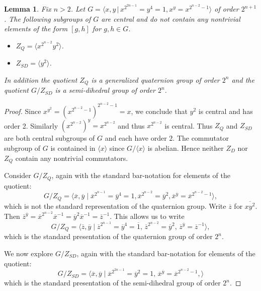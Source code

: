 \documentclass[12pt]{amsart}
\newtheorem{lemma}[theorem]{Lemma}
\begin{document}
\begin{lemma}\label{lem: Q_SD}
Fix $n>2$. Let $G =\langle x,y\,|\, x^{2^{2n-1}}=y^4 = 1, x^y = x^{2^{n-2}-1}\rangle$ of order $2^{n+1}$. 
The following subgroups of $G$ are central and do not contain any nontrivial elements of the form $[g,h]$ for $g,h\in G$. 
\begin{itemize} 
\item $Z_Q = \langle  x^{2^{n-2}} y^2 \rangle$.
\item $Z_{SD} = \langle y^2 \rangle$.
\end{itemize} In addition the quotient $Z_Q$ is a generalized quaternion group of order $2^n$ and the quotient $G/Z_{SD}$ is a semi-dihedral group of order $2^n$. 
\end{lemma}
\begin{proof}
    Since $x^{y^2} = (x^{2^{n-2}-1})^{2^{n-2}-1} = x$, we conclude that $y^2$ is central and has order 2. Similarly $({x^{2^{n-2}}})^y = x^{2^{n-2}}$ and thus $x^{2^{n-2}}$ is central. Thus $Z_Q$ and $Z_{SD}$ are both central subgroups of $G$ and each have order $2$. The commutator subgroup of $G$ is contained in $\langle x \rangle$ since $G/\langle x \rangle$ is abelian. Hence neither $Z_D$ nor $Z_Q$ contain any nontrivial commutators. 

Consider $G/Z_Q$, again with the standard bar-notation for elements of the quotient: 
\[G/Z_Q = \langle \overline{x},\overline{y}\;|\; \overline{x}^{2^{n-1}} = \overline{y}^{4} = 1, \overline{x}^{2^{n-2}}=\overline{y}^2, \overline{x}^{\overline{y}} = \overline{x}^{2^{n-2}-1}\rangle ,\] which is not the standard representation of the quaternion group. Write  $\overline{z}$ for $\overline{xy^2}$. Then $\overline{z}^{\overline{y}} = \overline{x}^{2^{n-2}}\overline{x}^{-1} = \overline{y}^2 \overline{x}^{-1} = \overline{z}^{-1}$. This allows us to write
\[G/Z_Q = \langle \overline{z}, \overline{y} \; | \; \overline{z}^{2^{n-1}} = \overline{y}^4 = \overline{1}, \,\overline{z}^{2^{n-2}} = \overline{y}^2,\, \overline{z}^{\overline{y}} = \overline{z}^{-1} \rangle,\] which is the standard presentation of the quaternion group of order $2^n$. 

We now explore $G/Z_{SD}$, again with the standard bar-notation for elements of the quotient:
\[
G/Z_{SD} = \langle \overline{x}, \overline{y} \; | \; \overline{x}^{2^{2n-1}} = \overline{y}^2 = 1,\, \overline{x}^{\overline{y}} = \overline{x}^{2^{n-2}-1},\rangle 
\] which is the standard presentation of the semi-dihedral group of order $2^n$. 
%
\end{proof}
\end{document}
